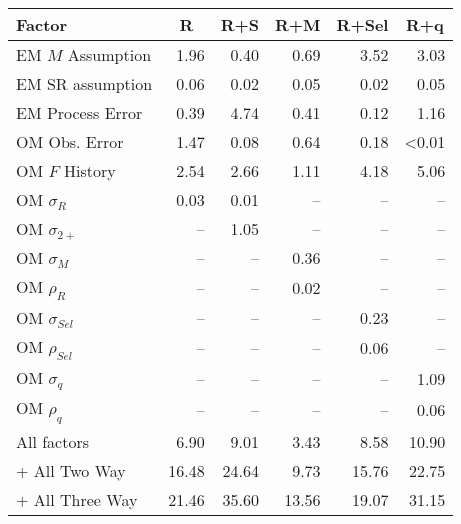 \begin{center}
\begin{tabular}{lrrrrr}
\hline\hline
\multicolumn{1}{l}{Factor}&\multicolumn{1}{c}{R}&\multicolumn{1}{c}{R+S}&\multicolumn{1}{c}{R+M}&\multicolumn{1}{c}{R+Sel}&\multicolumn{1}{c}{R+q}\tabularnewline
\hline
EM $M$ Assumption& 1.96& 0.40& 0.69& 3.52& 3.03\tabularnewline
EM SR assumption& 0.06& 0.02& 0.05& 0.02& 0.05\tabularnewline
EM Process Error& 0.39& 4.74& 0.41& 0.12& 1.16\tabularnewline
OM Obs. Error& 1.47& 0.08& 0.64& 0.18&\textless  0.01\tabularnewline
OM $F$ History& 2.54& 2.66& 1.11& 4.18& 5.06\tabularnewline
OM $\sigma_R$& 0.03& 0.01&--&--&--\tabularnewline
OM $\sigma_{2+}$ &--& 1.05&--&--&--\tabularnewline
OM $\sigma_M$&--&--& 0.36&--&--\tabularnewline
OM $\rho_R$&--&--& 0.02&--&--\tabularnewline
OM $\sigma_{Sel}$&--&--&--& 0.23&--\tabularnewline
OM $\rho_{Sel}$&--&--&--& 0.06&--\tabularnewline
OM $\sigma_q$&--&--&--&--& 1.09\tabularnewline
OM $\rho_q$&--&--&--&--& 0.06\tabularnewline
All factors& 6.90& 9.01& 3.43& 8.58&10.90\tabularnewline
+ All Two Way&16.48&24.64& 9.73&15.76&22.75\tabularnewline
+ All Three Way&21.46&35.60&13.56&19.07&31.15\tabularnewline
\hline
\end{tabular}\end{center}
